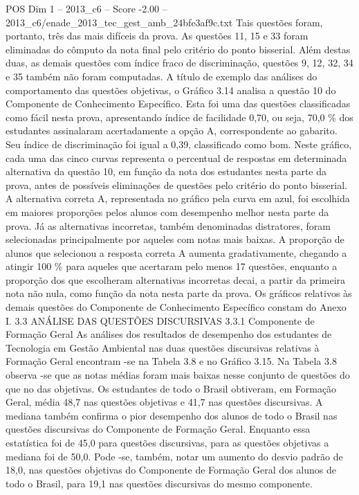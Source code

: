 \begin{textsample}{POS Dim 1 – 2013\_c6 – Score -2.00 – 2013\_c6/enade\_2013\_tec\_gest\_amb\_24bfe3af9c.txt}
Tais questões foram, portanto, três das mais difíceis da prova.
As questões 11, 15 e 33 foram eliminadas do cômputo da nota final pelo critério do ponto bisserial.
Além destas duas, as demais questões com índice fraco de discriminação, questões 9, 12, 32, 34 e 35 também não foram computadas.
A título de exemplo das análises do comportamento das questões objetivas, o Gráfico 3.14 analisa a questão 10 do Componente de Conhecimento Específico.
Esta foi uma das questões classificadas como fácil nesta prova, apresentando índice de facilidade 0,70, ou seja, 70,0 \% dos estudantes assinalaram acertadamente a opção A, correspondente ao gabarito.
Seu índice de discriminação foi igual a 0,39, classificado como bom.
Neste gráfico, cada uma das cinco curvas representa o percentual de respostas em determinada alternativa da questão 10, em função da nota dos estudantes nesta parte da prova, antes de possíveis eliminações de questões pelo critério do ponto bisserial.
A alternativa correta A, representada no gráfico pela curva em azul, foi escolhida em maiores proporções pelos alunos com desempenho melhor nesta parte da prova.
Já as alternativas incorretas, também denominadas distratores, foram selecionadas principalmente por aqueles com notas mais baixas.
A proporção de alunos que selecionou a resposta correta A aumenta gradativamente, chegando a atingir 100 \% para aqueles que acertaram pelo menos 17 questões, enquanto a proporção dos que escolheram alternativas incorretas decai, a partir da primeira nota não nula, como função da nota nesta parte da prova.
Os gráficos relativos às demais questões do Componente de Conhecimento Específico constam do Anexo I. 3.3 ANÁLISE DAS QUESTÕES DISCURSIVAS 3.3.1 Componente de Formação Geral As análises dos resultados de desempenho dos estudantes de Tecnologia em Gestão Ambiental nas duas questões discursivas relativas à Formação Geral encontram -se na Tabela 3.8 e no Gráfico 3.15.
Na Tabela 3.8 observa -se que as notas médias foram mais baixas nesse conjunto de questões do que no das objetivas.
Os estudantes de todo o Brasil obtiveram, em Formação Geral, média 48,7 nas questões objetivas e 41,7 nas questões discursivas.
A mediana também confirma o pior desempenho dos alunos de todo o Brasil nas questões discursivas do Componente de Formação Geral.
Enquanto essa estatística foi de 45,0 para questões discursivas, para as questões objetivas a mediana foi de 50,0.
Pode -se, também, notar um aumento do desvio padrão de 18,0, nas questões objetivas do Componente de Formação Geral dos alunos de todo o Brasil, para 19,1 nas questões discursivas do mesmo componente.

\end{textsample}
